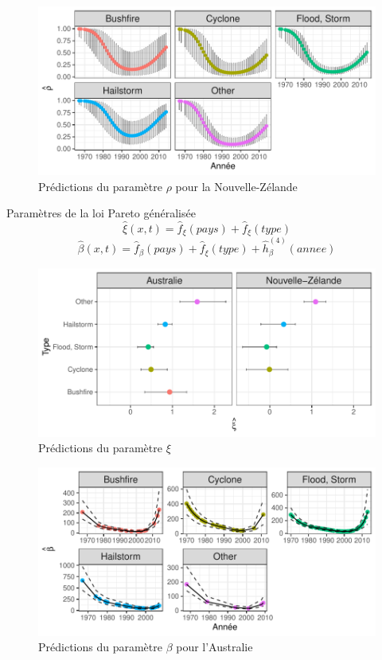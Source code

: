 \begin{frame}
\begin{figure}
\includegraphics[width=.8\textwidth]{images/fig-024.pdf}
\caption{Prédictions du paramètre $\rho$ pour la Nouvelle-Zélande}
\end{figure}
\end{frame}


\begin{frame}{Paramètres de la loi Pareto généralisée}
\begin{equation*}
\hat\xi(x,t) = \hat{f}_\xi(pays) + \hat{f}_\xi(type)
\end{equation*}
\begin{equation*}
\hat\beta(x,t) = \hat{f}_\beta(pays) + \hat{f}_\xi(type) + \hat{h}^{(4)}_\beta(annee)
\end{equation*}
\end{frame}

\begin{frame}
\begin{figure}
\includegraphics[width=.8\textwidth]{images/fig-026.pdf}
\caption{Prédictions du paramètre $\xi$}
\end{figure}
\end{frame}


\begin{frame}
\begin{figure}
\includegraphics[width=.8\textwidth]{images/fig-027.pdf}
\caption{Prédictions du paramètre $\beta$ pour l'Australie}
\end{figure}
\end{frame}


